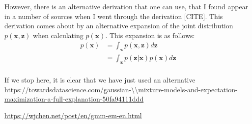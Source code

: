 \documentclass{article}
\begin{document}
However, there is an alternative derivation that one can use, that I found appear in a number of sources when I went through the derivation [CITE]. This derivation comes about by an alternative expansion of the joint distribution $p(\mathbf{x}, \mathbf{z})$ when calculating $p(\mathbf{x})$. This expansion is as follows:
\begin{equation}
\begin{aligned}
p(\mathbf{x}) &= \int_{\mathbf{z}} p(\mathbf{x}, \mathbf{z}) d\mathbf{z} \\
&= \int_{\mathbf{z}}p(\mathbf{z}\vert\mathbf{x})p(\mathbf{x})d\mathbf{z} \\
\end{aligned}
\end{equation}

If we stop here, it is clear that we have just used an alternative 
\url{https://towardsdatascience.com/gaussian-\\mixture-models-and-expectation-maximization-a-full-explanation-50fa94111ddd} 

\url{https://wjchen.net/post/en/gmm-em-en.html}
\end{document}
